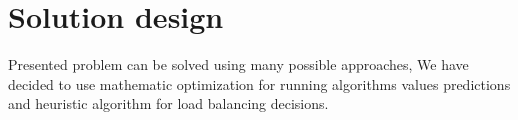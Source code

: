 \chapter{Solution design}\label{ch:solution-design}
Presented problem can be solved using many possible approaches,
We have decided to use mathematic optimization for running algorithms values predictions
and heuristic algorithm for load balancing decisions.





